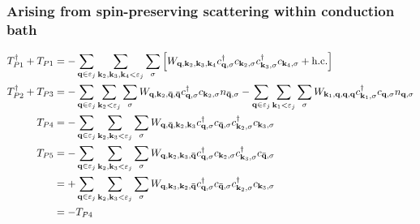 \subsubsection*{Arising from spin-preserving scattering within conduction bath}
\begin{equation}\begin{aligned}
	T_{P1}^\dagger + T_{P1} &= -\sum_{{\bf q} \in \varepsilon_j}\sum_{{\bf k}_2, {\bf k}_3, {\bf k}_4 < \varepsilon_j}\sum_{\sigma} \left[W_{{\bf q},{\bf k}_2,{\bf k}_3,{\bf k}_4}c^\dagger_{{\bf q},\sigma}c_{{\bf k}_2,\sigma}c^\dagger_{{\bf k}_3,\sigma}c_{{\bf k}_4,\sigma} + \text{h.c.}\right]\\
	T_{P2}^\dagger + T_{P3} &= -\sum_{{\bf q} \in \varepsilon_j}\sum_{{\bf k}_2 < \varepsilon_j}\sum_{\sigma} W_{{\bf q},{\bf k}_2,{\bf \bar q}, {\bf \bar q}} c^\dagger_{{\bf q},\sigma}c_{{\bf k}_2,\sigma} n_{{\bf \bar q},\sigma} -\sum_{{\bf q} \in \varepsilon_j}\sum_{{\bf k}_1 < \varepsilon_j}\sum_{\sigma} W_{{\bf k}_1,{\bf q},{\bf q},{\bf q}} c^\dagger_{{\bf k}_1,\sigma}c_{{\bf q},\sigma} n_{{\bf q},\sigma}\\
	T_{P4} &= -\sum_{{\bf q} \in \varepsilon_j}\sum_{{\bf k}_2, {\bf k}_3 < \varepsilon_j}\sum_{\sigma}W_{{\bf q},{\bf \bar q},{\bf k}_2,{\bf k}_3} c^\dagger_{{\bf q},\sigma}c_{{\bf \bar q},\sigma}c^\dagger_{{\bf k}_2,\sigma}c_{{\bf k}_3,\sigma}\\
	T_{P5} &= -\sum_{{\bf q} \in \varepsilon_j}\sum_{{\bf k}_2, {\bf k}_3 < \varepsilon_j}\sum_{\sigma} W_{{\bf q},{\bf k}_2,{\bf k}_3,{\bf \bar q}} c^\dagger_{{\bf q},\sigma}c_{{\bf k}_2,\sigma}c^\dagger_{{\bf k}_3,\sigma}c_{{\bf \bar q},\sigma}\\
		   &= +\sum_{{\bf q} \in \varepsilon_j}\sum_{{\bf k}_2, {\bf k}_3 < \varepsilon_j}\sum_{\sigma} W_{{\bf q},{\bf k}_3,{\bf k}_2,{\bf \bar q}} c^\dagger_{{\bf q},\sigma}c_{{\bf \bar q},\sigma}c^\dagger_{{\bf k}_2,\sigma}c_{{\bf k}_3,\sigma}\\
		   &= -T_{P4}
\end{aligned}\end{equation}

